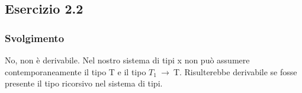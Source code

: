 \subsection*{Esercizio 2.2}

\subsubsection*{Svolgimento}
 	\begin{prooftree} 
	\end{prooftree} 

No, non \`e derivabile. Nel nostro sistema di tipi x non pu\`o assumere contemporaneamente il tipo T e il tipo $T_1\:\rightarrow\:$T. Risulterebbe derivabile se fosse presente il tipo ricorsivo nel sistema di tipi. \\


